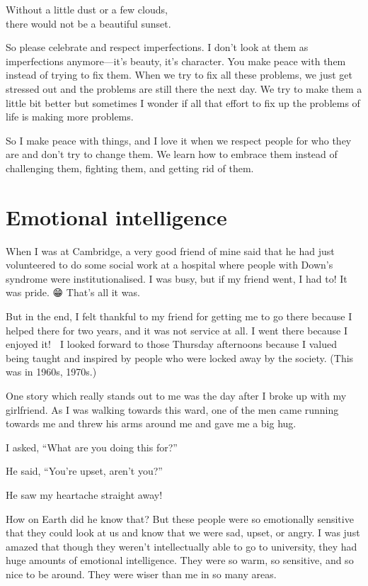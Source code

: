 \documentclass[12pt, openany]{book}
\newenvironment{aphorism}%
{%
\begin{center}\begin{itshape}
}%
{\end{itshape}\end{center}
}%
\begin{document}
\begin{aphorism}
Without a little dust or a few clouds,\\  
there would not be a beautiful sunset.
\end{aphorism}

So please celebrate and respect imperfections. I don’t look at them as imperfections anymore—it’s beauty, it’s character. You make peace with them instead of trying to fix them. When we try to fix all these problems, we just get stressed out and the problems are still there the next day. We try to make them a little bit better but sometimes I wonder if all that effort to fix up the problems of life is making more problems. 

So I make peace with things, and I love it when we respect people for who they are and don’t try to change them. We learn how to embrace them instead of challenging them, fighting them, and getting rid of them. 

\section*{Emotional intelligence}

When I was at Cambridge, a very good friend of mine said that he had just volunteered to do some social work at a hospital where people with Down’s syndrome were institutionalised. I was busy, but if my friend went, I had to! It was pride. 😁 That’s all it was. 

But in the end, I felt thankful to my friend for getting me to go there because I helped there for two years, and it was not service at all. I went there because I enjoyed it! 🤩 I looked forward to those Thursday afternoons because I valued being taught and inspired by people who were locked away by the society. (This was in 1960s, 1970s.) 

One story which really stands out to me was the day after I broke up with my girlfriend. As I was walking towards this ward, one of the men came running towards me and threw his arms around me and gave me a big hug. 

I asked, “What are you doing this for?” 

He said, “You’re upset, aren’t you?” 

He saw my heartache straight away! 

How on Earth did he know that? But these people were so emotionally sensitive that they could look at us and know that we were sad, upset, or angry. I was just amazed that though they weren’t intellectually able to go to university, they had huge amounts of emotional intelligence. They were so warm, so sensitive, and so nice to be around. They were wiser than me in so many areas. 
\end{document}

